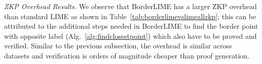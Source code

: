 

\textit{ZKP Overhead Results.} We observe that BorderLIME has a larger ZKP overhead than standard LIME as shown in Table~\ref{tab:borderlimevslimeallzkp}; this can be attributed to the additional steps needed in BorderLIME to find the border point with opposite label (Alg.~\ref{alg:findclosestpoint}) which also have to be proved and verified. Similar to the previous subsection, the overhead is similar across datasets and verification is orders of magnitude cheaper than proof generation.


\begin{table}[ht]
  \centering
  \smallskip
      \caption{\label{tab:borderlimevslimeallzkp} ZKP Overhead of BorderLIME and Standard LIME (both  G+N variant) for NNs. Overhead for BorderLIME is larger than that for LIME. Results are consistent across all datasets.}%
\end{table}





